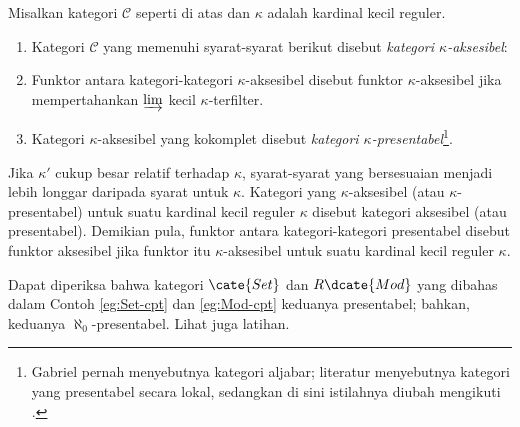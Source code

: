 \begin{definition}\label{def:presentable-cat}
	Misalkan kategori $\mathcal{C}$ seperti di atas dan $\kappa$ adalah kardinal kecil reguler.
	\begin{enumerate}
		\item Kategori $\mathcal{C}$ yang memenuhi syarat-syarat berikut disebut \emph{kategori $\kappa$-aksesibel}:
		\item Funktor antara kategori-kategori $\kappa$-aksesibel disebut funktor $\kappa$-aksesibel jika mempertahankan $\varinjlim$ kecil $\kappa$-terfilter.
		\item Kategori $\kappa$-aksesibel yang kokomplet disebut \emph{kategori $\kappa$-presentabel}\footnote{Gabriel pernah menyebutnya kategori aljabar; literatur \cite{AR94, GU71} menyebutnya kategori yang presentabel secara lokal, sedangkan di sini istilahnya diubah mengikuti \cite[A.1.1]{Lu09}.}.
	\end{enumerate}

	Jika $\kappa'$ cukup besar relatif terhadap $\kappa$, syarat-syarat yang bersesuaian menjadi lebih longgar daripada syarat untuk $\kappa$. Kategori yang $\kappa$-aksesibel (atau $\kappa$-presentabel) untuk suatu kardinal kecil reguler $\kappa$ disebut kategori aksesibel (atau presentabel). Demikian pula, funktor antara kategori-kategori presentabel disebut funktor aksesibel jika funktor itu $\kappa$-aksesibel untuk suatu kardinal kecil reguler $\kappa$.
\end{definition}

Dapat diperiksa bahwa kategori $\cate{Set}$ dan $R\dcate{Mod}$ yang dibahas dalam Contoh \ref{eg:Set-cpt} dan \ref{eg:Mod-cpt} keduanya presentabel; bahkan, keduanya $\aleph_0$-presentabel. Lihat juga latihan.

